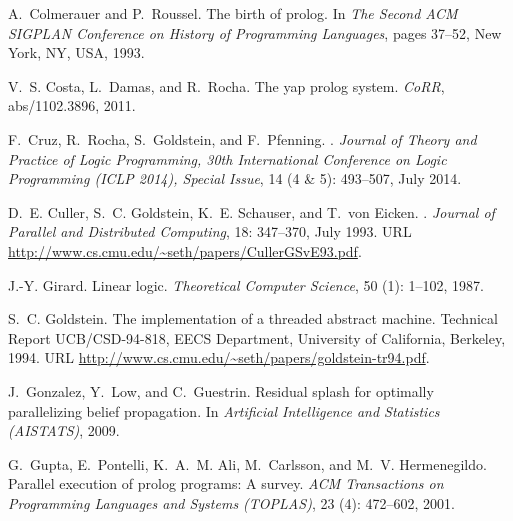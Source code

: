 \documentclass{sigplanconf}
\begin{document}
\begin{thebibliography}{35}
A.~Colmerauer and P.~Roussel.
\newblock The birth of prolog.
\newblock In \emph{The Second ACM SIGPLAN Conference on History of Programming
  Languages}, pages 37--52, New York, NY, USA, 1993.

V.~S. Costa, L.~Damas, and R.~Rocha.
\newblock The yap prolog system.
\newblock \emph{CoRR}, abs/1102.3896, 2011.

F.~Cruz, R.~Rocha, S.~Goldstein, and F.~Pfenning.
.
\newblock \emph{Journal of Theory and Practice of Logic Programming, 30th
  International Conference on Logic Programming (ICLP 2014), Special Issue},
  14 (4 \& 5): 493--507, July 2014.

D.~E. Culler, S.~C. Goldstein, K.~E. Schauser, and T.~von Eicken.
.
\newblock \emph{Journal of Parallel and Distributed Computing}, 18:
  347--370, July 1993.
\newblock URL \url{http://www.cs.cmu.edu/~seth/papers/CullerGSvE93.pdf}.

J.-Y. Girard.
\newblock Linear logic.
\newblock \emph{Theoretical Computer Science}, 50 (1):
  1--102, 1987.

S.~C. Goldstein.
\newblock The implementation of a threaded abstract machine.
\newblock Technical Report UCB/CSD-94-818, EECS Department, University of
  California, Berkeley, 1994.
\newblock URL \url{http://www.cs.cmu.edu/~seth/papers/goldstein-tr94.pdf}.

J.~Gonzalez, Y.~Low, and C.~Guestrin.
\newblock Residual splash for optimally parallelizing belief propagation.
\newblock In \emph{Artificial Intelligence and Statistics (AISTATS)}, 2009.

G.~Gupta, E.~Pontelli, K.~A.~M. Ali, M.~Carlsson, and M.~V. Hermenegildo.
\newblock Parallel execution of prolog programs: {A} survey.
\newblock \emph{ACM Transactions on Programming Languages and Systems
  (TOPLAS)}, 23 (4): 472--602, 2001.


\end{thebibliography}
\end{document}
